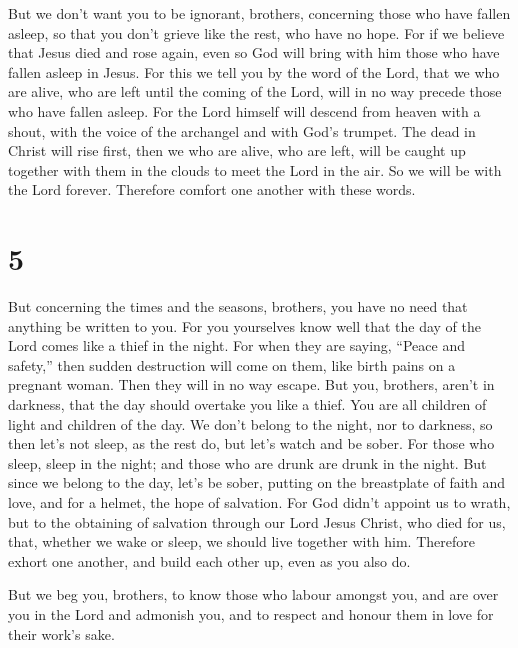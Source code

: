  But we don't want you to be ignorant, brothers, concerning
those who have fallen asleep, so that you don't grieve like the rest,
who have no hope.  For if we believe that Jesus died and
rose again, even so God will bring with him those who have fallen asleep
in Jesus.  For this we tell you by the word of the Lord,
that we who are alive, who are left until the coming of the Lord, will
in no way precede those who have fallen asleep.  For the
Lord himself will descend from heaven with a shout, with the voice of
the archangel and with God's trumpet. The dead in Christ will rise
first,  then we who are alive, who are left, will be caught
up together with them in the clouds to meet the Lord in the air. So we
will be with the Lord forever.  Therefore comfort one
another with these words.

\hypertarget{section-4}{%
\section{5}\label{section-4}}

 But concerning the times and the seasons, brothers, you
have no need that anything be written to you.  For you
yourselves know well that the day of the Lord comes like a thief in the
night.  For when they are saying, ``Peace and safety,'' then
sudden destruction will come on them, like birth pains on a pregnant
woman. Then they will in no way escape.  But you, brothers,
aren't in darkness, that the day should overtake you like a thief.
 You are all children of light and children of the day. We
don't belong to the night, nor to darkness,  so then let's
not sleep, as the rest do, but let's watch and be sober. 
For those who sleep, sleep in the night; and those who are drunk are
drunk in the night.  But since we belong to the day, let's
be sober, putting on the breastplate of faith and love, and for a
helmet, the hope of salvation.  For God didn't appoint us to
wrath, but to the obtaining of salvation through our Lord Jesus Christ,
 who died for us, that, whether we wake or sleep, we should
live together with him.  Therefore exhort one another, and
build each other up, even as you also do.

 But we beg you, brothers, to know those who labour amongst
you, and are over you in the Lord and admonish you,  and to
respect and honour them in love for their work's sake.

